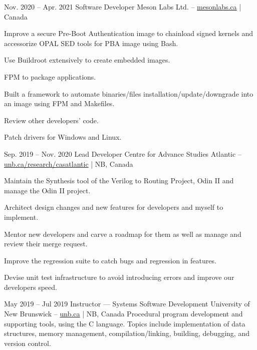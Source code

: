 \entrys
{Nov. 2020 -- Apr. 2021}
{Software Developer}
{Meson Labs Ltd. -- \href{https://www.mesonlabs.ca/}{mesonlabs.ca} | Canada}{
	Improve a secure Pre-Boot Authentication image to chainload signed kernels and accessorize OPAL SED tools for PBA image using Bash.
	\begin{tightemize}
		\item Use Buildroot extensively to create embedded images.
		\item FPM to package applications.
		\item Built a framework to automate binaries/files installation/update/downgrade into an image using FPM and Makefiles.
		\item Review other developers' code.
		\item Patch drivers for Windows and Linux.
	\end{tightemize}
}

\entrys
{Sep. 2019 -- Nov. 2020}
{Lead Developer}
{Centre for Advance Studies Atlantic -- \href{https://www.unb.ca/research/casatlantic/}{unb.ca/research/casatlantic} | NB, Canada}{
	Maintain the Synthesis tool of the Verilog to Routing Project, Odin II and manage the Odin II project.
	\begin{tightemize}
		\item Architect design changes and new features for developers and myself to implement.
		\item Mentor new developers and carve a roadmap for them as well as manage and review their merge request.
		\item Improve the regression suite to catch bugs and regression in features.
        \item Devise unit test infrastructure to avoid introducing errors and improve our developers speed.
	\end{tightemize}
}

\entrys
{May 2019 -- Jul 2019}
{Instructor --- Systems Software Development}
{University of New Brunswick -- \href{https://www.unb.ca}{unb.ca} | NB, Canada}{
    Procedural program development and supporting tools, using the C language.
    Topics include implementation of data structures, memory management, compilation/linking, building, debugging, and version control.
}


